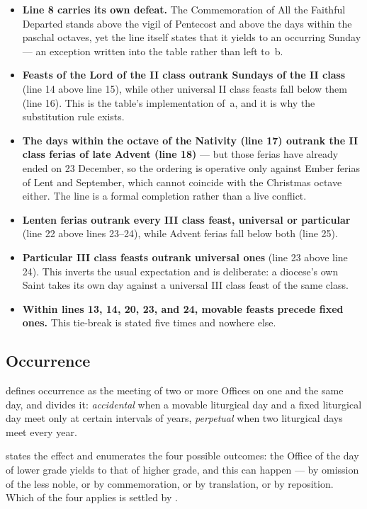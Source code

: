 \begin{itemize}[leftmargin=1.3em, itemsep=0.3em]
\item \textbf{Line 8 carries its own defeat.} The Commemoration of All the Faithful Departed
stands above the vigil of Pentecost and above the days within the paschal octaves, yet the line
itself states that it yields to an occurring Sunday — an exception written into the table rather
than left to \,b.
\item \textbf{Feasts of the Lord of the II class outrank Sundays of the II class} (line 14 above
line 15), while other universal II class feasts fall below them (line 16). This is the table's
implementation of \,a, and it is why the substitution rule exists.
\item \textbf{The days within the octave of the Nativity (line 17) outrank the II class ferias
of late Advent (line 18)} — but those ferias have already ended on 23 December, so the ordering
is operative only against Ember ferias of Lent and September, which cannot coincide with the
Christmas octave either. The line is a formal completion rather than a live conflict.
\item \textbf{Lenten ferias outrank every III class feast, universal or particular} (line 22
above lines 23--24), while Advent ferias fall below both (line 25).
\item \textbf{Particular III class feasts outrank universal ones} (line 23 above line 24). This
inverts the usual expectation and is deliberate: a diocese's own Saint takes its own day against
a universal III class feast of the same class.
\item \textbf{Within lines 13, 14, 20, 23, and 24, movable feasts precede fixed ones.} This
tie-break is stated five times and nowhere else.
\end{itemize}

\subsection{Occurrence}

 defines occurrence as the meeting of two or more Offices on one and the same day, and
divides it: \emph{accidental} when a movable liturgical day and a fixed liturgical day meet only
at certain intervals of years, \emph{perpetual} when two liturgical days meet every year.

 states the effect and enumerates the four possible outcomes: the Office of the day of
lower grade yields to that of higher grade, and this can happen  — by omission of the less
noble, or by commemoration, or by translation, or by reposition. Which of the four applies is
settled by .

